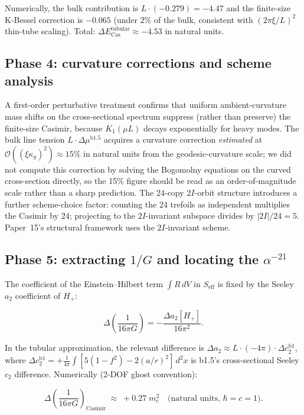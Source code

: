 \documentclass[11pt]{article}
\begin{document}
Numerically, the bulk contribution is $L \cdot (-0.279) = -4.47$ and
the finite-size K-Bessel correction is $-0.065$ (under $2\%$ of the
bulk, consistent with $(2 \pi \xi / L)^2$ thin-tube scaling).  Total:
$\Delta E_\text{Cas}^\text{tubular} \approx -4.53$  in natural units.

\subsection{Phase 4: curvature corrections and scheme analysis}

A first-order perturbative treatment confirms that uniform
ambient-curvature mass shifts on the cross-sectional spectrum
suppress (rather than preserve) the finite-size Casimir, because
$K_1(\mu L)$ decays exponentially for heavy modes.  The bulk line
tension $L \cdot \Delta \mu^\text{b1.5}$ acquires a curvature
correction \emph{estimated} at $\mathcal{O}((\xi \kappa_g)^2)
\approx 15\%$ in natural units from the geodesic-curvature scale;
we did not compute this correction by solving the Bogomolny
equations on the curved cross-section directly, so the 15\% figure
should be read as an order-of-magnitude scale rather than a sharp
prediction.  The 24-copy $2I$-orbit structure introduces a further
scheme-choice factor: counting the 24 trefoils as independent
multiplies the Casimir by $24$; projecting to the $2I$-invariant
subspace divides by $|2I|/24 = 5$.  Paper~15's structural framework
uses the $2I$-invariant scheme.

\subsection{Phase 5: extracting $1/G$ and locating the
$\alpha^{-21}$}
\label{sec:wilson-gap}

The coefficient of the Einstein--Hilbert term $\int R \, dV$ in
$S_\text{eff}$ is fixed by the Seeley $a_2$ coefficient of $H_+$:

\begin{equation}
  \Delta \!\left(\frac{1}{16 \pi G}\right)
   =  -\frac{\Delta a_2[H_+]}{16 \pi^2} .
\end{equation}

In the tubular approximation, the relevant difference is
$\Delta a_2 \approx L \cdot (-4 \pi) \cdot \Delta c_2^\text{b1}$,
where $\Delta c_2^\text{b1} = +\frac{1}{4 \pi}
\int [5 (1{-}f^2) - 2 (a/r)^2]\, d^2 x$ is b1.5's cross-sectional
Seeley $c_2$ difference.  Numerically (2-DOF ghost convention):

\begin{equation}
\boxed{
  \Delta\!\left(\frac{1}{16 \pi G}\right)_\text{Casimir}
  \;\approx\; +0.27 \; m_e^2  \quad \text{(natural units, } \hbar = c = 1\text{)}.
}
\end{equation}
\end{document}
